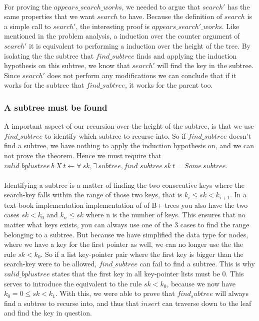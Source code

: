 \paragraph{}
For proving the $appears\_search\_works$, we needed to argue that $search'$ has the same properties that we want $search$ to have. Because the definition of $search$ is a simple call to $search'$, the interesting proof is $appears\_search'\_works$. Like mentioned in the problem analysis, a induction over the counter argument of $search'$ it is equivalent to performing a induction over the height of the tree. By isolating the the subtree that $find\_subtree$ finds and applying the induction hypothesis on this subtree, we know that $search'$ will find the key in the subtree. Since $search'$ does not perform any modifications we can conclude that if it works for the subtree that $find\_subtree$, it works for the parent too. 

\subsubsection{A subtree must be found}
A important aspect of our recursion over the height of the subtree, is that we use $find\_subtree$ to identify which subtree to recurse into. So if $find\_subtree$ doesn't find a subtree, we have nothing to apply the induction hypothesis on, and we can not prove the theorem. Hence we must require that
$valid\_bplustree~b~X~t \leftarrow \forall~sk, \exists~subtree, find\_subtree~ sk~t = Some~subtree$.

\paragraph{}
Identifying a subtree is a matter of finding the two consecutive keys where the search-key falls within the range of those two keys, that is $k_i \le sk < k_{i+1}$. In a text-book implementation implementation of of B+ trees you also have the two cases $sk < k_0$ and $k_{n} \le sk$ where n is the number of keys. This ensures that no matter what keys exists, you can always use one of the 3 cases to find the range belonging to a subtree. But because we have simplified the data type for nodes, where we have a key for the first pointer as well, we can no longer use the the rule $sk < k_0$. So if a list key-pointer pair where the first key is bigger than the search-key were to be allowed, $find\_subtree$ can fail to find a subtree. This is why $valid\_bplustree$ states that the first key in all key-pointer lists must be 0. This serves to introduce the equivalent to the rule $sk < k_0$, because we now have $k_0 = 0 \le sk < k_1$. With this, we were able to prove that $find_subtree$ will always find a subtree to recurse into, and thus that $insert$ can traverse down to the leaf and find the key in question.

